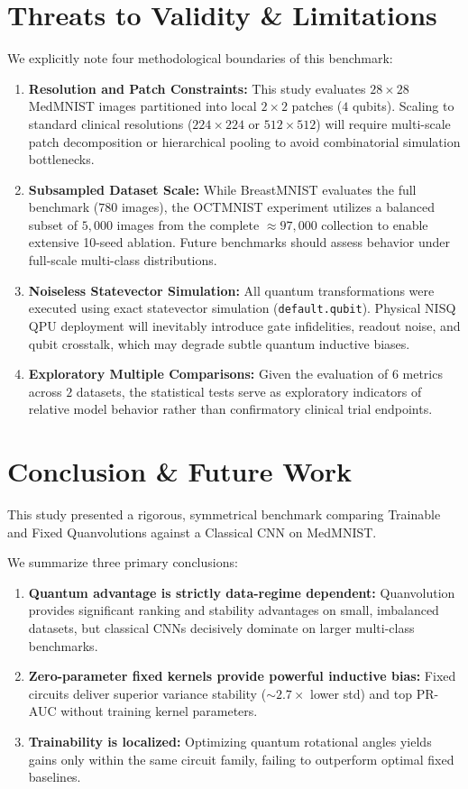 \documentclass[runningheads]{llncs}
\begin{document}
\section{Threats to Validity \& Limitations}
We explicitly note four methodological boundaries of this benchmark:
\begin{enumerate}
    \item \textbf{Resolution and Patch Constraints:} This study evaluates $28 \times 28$ MedMNIST images partitioned into local $2 \times 2$ patches ($4$ qubits). Scaling to standard clinical resolutions ($224 \times 224$ or $512 \times 512$) will require multi-scale patch decomposition or hierarchical pooling to avoid combinatorial simulation bottlenecks.
    \item \textbf{Subsampled Dataset Scale:} While BreastMNIST evaluates the full benchmark ($780$ images), the OCTMNIST experiment utilizes a balanced subset of $5{,}000$ images from the complete $\approx 97{,}000$ collection to enable extensive 10-seed ablation. Future benchmarks should assess behavior under full-scale multi-class distributions.
    \item \textbf{Noiseless Statevector Simulation:} All quantum transformations were executed using exact statevector simulation (\texttt{default.qubit}). Physical NISQ QPU deployment will inevitably introduce gate infidelities, readout noise, and qubit crosstalk, which may degrade subtle quantum inductive biases.
    \item \textbf{Exploratory Multiple Comparisons:} Given the evaluation of $6$ metrics across $2$ datasets, the statistical tests serve as exploratory indicators of relative model behavior rather than confirmatory clinical trial endpoints.
\end{enumerate}

\section{Conclusion \& Future Work}
This study presented a rigorous, symmetrical benchmark comparing Trainable and Fixed Quanvolutions against a Classical CNN on MedMNIST.

We summarize three primary conclusions:
\begin{enumerate}
    \item \textbf{Quantum advantage is strictly data-regime dependent:} Quanvolution provides significant ranking and stability advantages on small, imbalanced datasets, but classical CNNs decisively dominate on larger multi-class benchmarks.
    \item \textbf{Zero-parameter fixed kernels provide powerful inductive bias:} Fixed circuits deliver superior variance stability ($\sim 2.7\times$ lower std) and top PR-AUC without training kernel parameters.
    \item \textbf{Trainability is localized:} Optimizing quantum rotational angles yields gains only within the same circuit family, failing to outperform optimal fixed baselines.
\end{enumerate}
\end{document}
